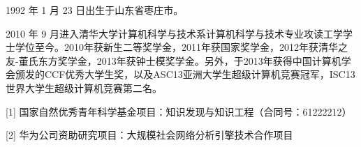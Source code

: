 \begin{resume}


  1992 年 1 月 23 日出生于山东省枣庄市。
  
  2010 年 9 月进入清华大学计算机科学与技术系计算机科学与技术专业攻读工学学士学位至今。2010年获新生二等奖学金，2011年获国家奖学金，2012年获清华之友-董氏东方奖学金，2013年获钟士模奖学金。另外，于2013年获得中国计算机学会颁发的CCF优秀大学生奖，以及ASC13亚洲大学生超级计算机竞赛冠军，ISC13世界大学生超级计算机竞赛第二名。
  
  [1] 国家自然优秀青年科学基金项目：知识发现与知识工程（合同号：61222212）

  [2] 华为公司资助研究项目：大规模社会网络分析引擎技术合作项目
  
\end{resume}
